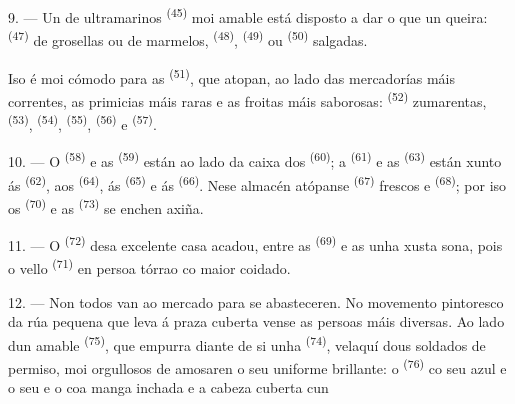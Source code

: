 9. --- Un  de ultramarinos \textsuperscript{(45)} moi amable está
disposto a dar o que un queira:  \textsuperscript{(47)} de grosellas
ou de marmelos,  \textsuperscript{(48)}, 
\textsuperscript{(49)} ou  \textsuperscript{(50)} salgadas.

Iso é moi cómodo para as  \textsuperscript{(51)}, que atopan, ao
lado das mercadorías máis correntes, as primicias máis raras e as froitas máis
saborosas:  \textsuperscript{(52)} zumarentas, 
\textsuperscript{(53)},  \textsuperscript{(54)}, 
\textsuperscript{(55)},  \textsuperscript{(56)} e 
\textsuperscript{(57)}.

\VUsaut{4.0mm}
\VUsaut{3.0mm}

10. --- O  \textsuperscript{(58)} e as 
\textsuperscript{(59)} están ao lado da caixa dos 
\textsuperscript{(60)}; a  \textsuperscript{(61)} e as 
\textsuperscript{(63)} están xunto ás  \textsuperscript{(62)}, aos
 \textsuperscript{(64)}, ás 
\textsuperscript{(65)} e ás  \textsuperscript{(66)}. Nese almacén
atópanse  \textsuperscript{(67)} frescos e 
\textsuperscript{(68)}; por iso os  \textsuperscript{(70)} e as
 \textsuperscript{(73)} se enchen axiña.

11. --- O  \textsuperscript{(72)} desa excelente casa acadou, entre as
 \textsuperscript{(69)} e as  unha xusta sona,
pois o vello  \textsuperscript{(71)} en persoa tórrao co maior
coidado.

\VUsaut{4.0mm}
\VUsaut{3.0mm}

12. --- Non todos van ao mercado para se abasteceren. No movemento pintoresco da rúa
pequena que leva á praza cuberta vense as persoas máis diversas. Ao lado dun amable
 \textsuperscript{(75)}, que empurra diante de si unha
 \textsuperscript{(74)}, velaquí dous soldados de permiso, moi
orgullosos de amosaren o seu uniforme brillante: o 
\textsuperscript{(76)} co seu  azul e o seu  e
o  coa manga inchada e a cabeza cuberta cun 

